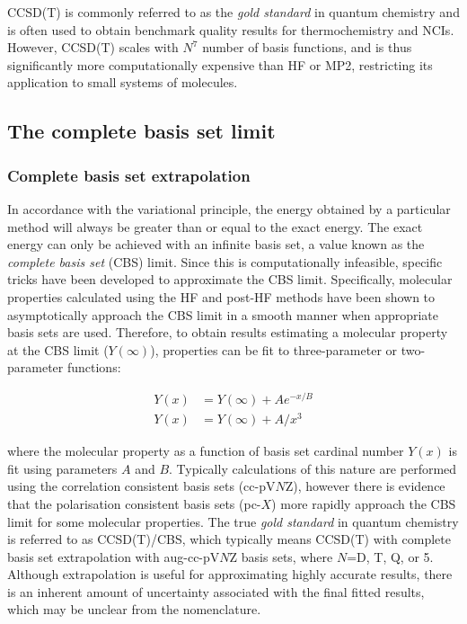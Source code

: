 CCSD(T) is commonly referred to as the \emph{gold standard} in quantum chemistry and is often used to obtain benchmark quality results for thermochemistry and NCIs.\cite{Levine2013} However, CCSD(T) scales with $N^7$ number of basis functions, and is thus significantly more computationally expensive than HF or MP2, restricting its application to small systems of molecules.

\subsection{The complete basis set limit}

\subsubsection{Complete basis set extrapolation}

In accordance with the variational principle, the energy obtained by a particular method will always be greater than or equal to the exact energy. The exact energy can only be achieved with an infinite basis set, a value known as the \emph{complete basis set} (CBS) limit.\cite{Truhlar1998} Since this is computationally infeasible, specific tricks have been developed to approximate the CBS limit. Specifically, molecular properties calculated using the HF and post-HF methods have been shown to asymptotically approach the CBS limit in a smooth manner when appropriate basis sets are used. Therefore, to obtain results estimating a molecular property at the CBS limit ($Y(\infty)$), properties can be fit to three-parameter\cite{Feller1992,Feller1993} or two-parameter functions:\cite{Helgaker1997,Halkier1998}

\begin{align}
  Y(x) &= Y(\infty) + Ae^{-x/B} \\
  Y(x) &= Y(\infty) + A/x^3
\end{align}

\noindent where the molecular property as a function of basis set cardinal number $Y(x)$ is fit using parameters $A$ and $B$. Typically calculations of this nature are performed using the correlation consistent basis sets (cc-pV$N$Z), however there is evidence that the polarisation consistent basis sets (pc-$X$) more rapidly approach the CBS limit for some molecular properties.\cite{Kupka2007} The true \emph{gold standard} in quantum chemistry is referred to as CCSD(T)/CBS, which typically means CCSD(T) with complete basis set extrapolation with aug-cc-pV$N$Z basis sets, where $N$=D, T, Q, or 5. Although extrapolation is useful for approximating highly accurate results, there is an inherent amount of uncertainty associated with the final fitted results, which may be unclear from the nomenclature.

